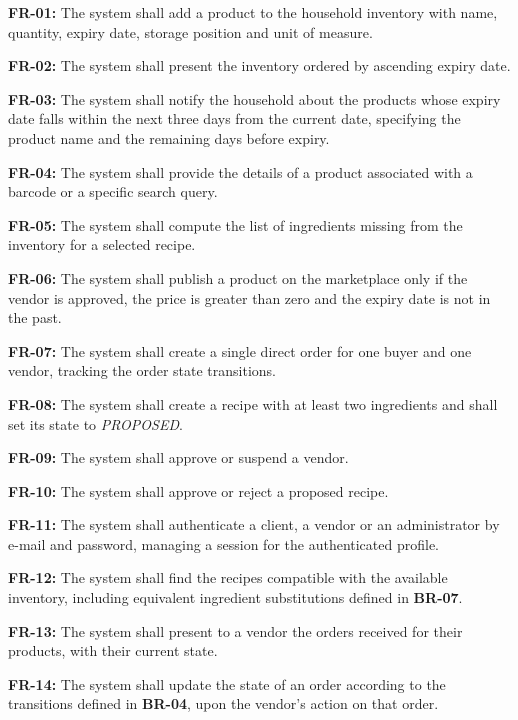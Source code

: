 \begin{reqs}
    \item \textbf{FR-01:} The system shall add a product to the household
    inventory with name, quantity, expiry date, storage position and unit of
    measure.
    \item \textbf{FR-02:} The system shall present the inventory ordered by
    ascending expiry date.
    \item \textbf{FR-03:} The system shall notify the household about the products whose expiry date falls within the next three days from the current date, specifying the product name and the remaining days before expiry.
    \item \textbf{FR-04:} The system shall provide the details of a product associated with a barcode or a specific search query.
    \item \textbf{FR-05:} The system shall compute the list of ingredients
    missing from the inventory for a selected recipe.
    \item \textbf{FR-06:} The system shall publish a product on the
    marketplace only if the vendor is approved, the price is greater than
    zero and the expiry date is not in the past.
    \item \textbf{FR-07:} The system shall create a single direct order for
    one buyer and one vendor, tracking the order state transitions.
    \item \textbf{FR-08:} The system shall create a recipe with at least two
    ingredients and shall set its state to \emph{PROPOSED}.
    \item \textbf{FR-09:} The system shall approve or suspend a vendor.
    \item \textbf{FR-10:} The system shall approve or reject a proposed
    recipe.
    \item \textbf{FR-11:} The system shall authenticate a client, a vendor
    or an administrator by e-mail and password, managing a session for the
    authenticated profile.
    \item \textbf{FR-12:} The system shall find the recipes compatible with the
    available inventory, including equivalent ingredient substitutions
    defined in \textbf{BR-07}.
    \item \textbf{FR-13:} The system shall present to a vendor the orders
    received for their products, with their current state.
    \item \textbf{FR-14:} The system shall update the state of an order
    according to the transitions defined in \textbf{BR-04}, upon the vendor's
    action on that order.
\end{reqs}

